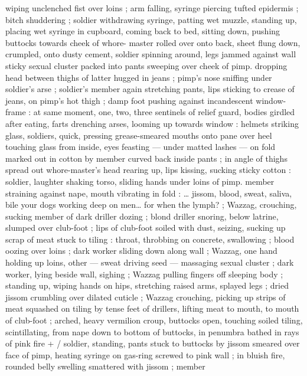 wiping unclenched fist over loins ; arm falling, syringe piercing tufted 
epidermis ; bitch shuddering ; soldier withdrawing syringe, patting 
wet muzzle, standing up, placing wet syringe in cupboard, coming 
back to bed, sitting down, pushing buttocks towards cheek of whore- 
master rolled over onto back, sheet flung down, crumpled, onto 
dusty cement, soldier spinning around, legs jammed against wall 
sticky sexual cluster packed into pants sweeping over cheek of pimp. 
dropping head between thighs of latter hugged in jeans ; pimp's 
nose sniffing under soldier's arse ; soldier's member again 
stretching pants, lips sticking to crease of jeans, on pimp's hot thigh 
; damp foot pushing against incandescent window-frame : at same 
moment, one, two, three sentinels of relief guard, bodies girdled 
after eating, farts drenching arses, looming up towards window : 
helmets striking glass, soldiers, quick, pressing grease-smeared 
mouths onto pane over heel touching glass from inside, eyes 
feasting --- under matted lashes --- on fold marked out in cotton by 
member curved back inside pants ; in angle of thighs spread out 
whore-master's head rearing up, lips kissing, sucking sticky cotton : 
soldier, laughter shaking torso, sliding hands under loins of pimp. 
member straining against nape, mouth vibrating in fold : {\ldots} {\gl} jissom, 
blood, sweat, saliva, bile{\td} your dogs working deep on men{\ldots} for 
when the lymph?{\td} {\gr} ; Wazzag, crouching, sucking member of dark 
driller dozing ; blond driller snoring, below latrine, slumped over 
club-foot ; lips of club-foot soiled with dust, seizing, sucking up 
scrap of meat stuck to tiling : throat, throbbing on concrete, 
swallowing ; blood oozing over loins ; dark worker sliding down along 
wall ; Wazzag, one hand holding up loins, other --- sweat driving 
seed --- massaging sexual cluster ; dark worker, lying beside wall, 
sighing ; Wazzag pulling fingers off sleeping body ; standing up, 
wiping hands on hips, stretching raised arms, splayed legs ; dried 
jissom crumbling over dilated cuticle ; Wazzag crouching, picking up 
strips of meat squashed on tiling by tense feet of drillers, lifting 
meat to mouth, to mouth of club-foot ; arched, heavy vermilion 
croup, buttocks open, touching soiled tiling, scintillating, from nape 
down to bottom of buttocks, in penumbra bathed in rays of pink fire 
+ {\slash} soldier, standing, pants stuck to buttocks by jissom smeared over 
face of pimp, heating syringe on gas-ring screwed to pink wall ; in 
bluish fire, rounded belly swelling smattered with jissom ; member 
